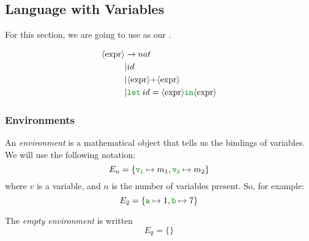 \subsection{Language with Variables}\label{subsec:Language_with_Variables}
For this section, we are going to use  as our .
\begin{blackbox}
  \begin{equation}\label{eq:LetAdd_Grammar}
    \begin{aligned}
      \Nonterminal{expr} &\rightarrow nat \\
      &\vert id \\
      &\vert \Nonterminal{expr} \SemanticInput{\mathtt{+}} \Nonterminal{expr} \\
      &\vert \SemanticInput{\mathtt{let}}\: id = \Nonterminal{expr} \SemanticInput{\mathtt{in}} \Nonterminal{expr} \\
    \end{aligned}
  \end{equation}
\end{blackbox}

\subsubsection{Environments}\label{subsubsec:Semantic_Environments}
\begin{definition}[Environment]\label{def:Semantic_Environment}
  An \emph{environment} is a mathematical object that tells us the bindings of variables.
  We will use the following notation:
  \begin{equation}\label{eq:Environment}
    E_{n} = \lbrace \SemanticInput{\mathtt{v_{1}}} \mapsto m_{1}, \SemanticInput{\mathtt{v_{2}}} \mapsto m_{2} \rbrace
  \end{equation}
  where $v$ is a variable, and $n$ is the number of variables present.
  So, for example:
  \begin{equation*}
    E_{2} = \lbrace \SemanticInput{\mathtt{a}} \mapsto 1, \SemanticInput{\mathtt{b}} \mapsto 7 \rbrace
  \end{equation*}

  \begin{remark}\label{rmk:Empty_Environment}
    The \emph{empty environment} is written
    \begin{equation}\label{eq:Empty_Environment}
      E_{\emptyset} = \lbrace \rbrace
    \end{equation}
  \end{remark}
\end{definition}

